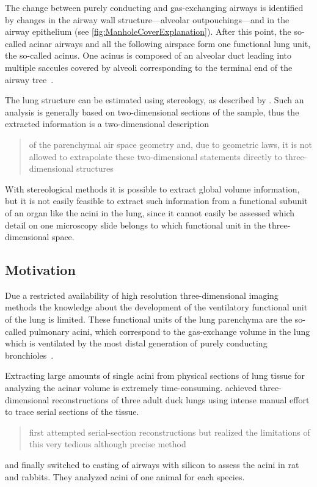 \documentclass[draft,a4paper,DIVcalc,abstract,english]{scrartcl}
\begin{document}
The change between purely conducting and gas-exchanging airways is identified by changes in the airway wall structure---alveolar outpouchings---and in the airway epithelium (see \autoref{fig:ManholeCoverExplanation}).
After this point, the so-called acinar airways and all the following airspace form one functional lung unit, the so-called acinus.
One acinus is composed of an alveolar duct leading into multiple saccules covered by alveoli corresponding to the terminal end of the airway tree~\citep{Schittny2007a}.

The lung structure can be estimated using stereology, as described by \citet{Hsia2010}.
Such an analysis is generally based on two-dimensional sections of the sample, thus the extracted information is a two-dimensional description \blockquote[\citet{Tschanz2002}]{of the parenchymal air space geometry and, due to geometric laws, it is not allowed to extrapolate these two-dimensional statements directly to three-dimensional structures}.
With stereological methods it is possible to extract global volume information, but it is not easily feasible to extract such information from a functional subunit of an organ like the acini in the lung, since it cannot easily be assessed which detail on one microscopy slide belongs to which functional unit in the three-dimensional space.

\subsection{Motivation}
Due a restricted availability of high resolution three-dimensional imaging methods the knowledge about the development of the ventilatory functional unit of the lung is limited.
These functional units of the lung parenchyma are the so-called pulmonary acini, which correspond to the gas-exchange volume in the lung which is ventilated by the most distal generation of purely conducting bronchioles~\citep{Rodriguez1987}.

Extracting large amounts of single acini from physical sections of lung tissue for analyzing the acinar volume is extremely time-consuming.
\citet{Woodward2005} achieved three-dimensional reconstructions of three adult duck lungs using intense manual effort to trace serial sections of the tissue.
\citet{Rodriguez1987} \blockquote{first attempted serial-section reconstructions but realized the limitations of this very tedious although precise method} and finally switched to casting of airways with silicon to assess the acini in rat and rabbits. They analyzed acini of one animal for each species.
\end{document}
